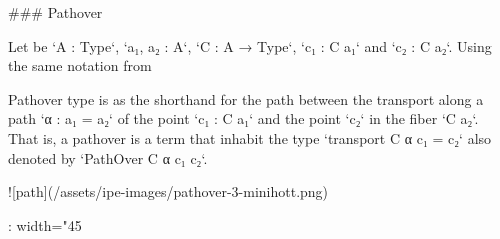 {### Pathover

Let be `A : Type`, `a₁, a₂ : A`, `C : A → Type`, `c₁ : C a₁` and `c₂ : C a₂`.
Using the same notation from {%
Pathover type is as the shorthand for the path between the transport along a
path `α : a₁ = a₂` of the point `c₁ : C a₁` and the point `c₂` in the fiber `C
a₂`. That is, a pathover is a term that inhabit the type `transport C α c₁ = c₂`
also denoted by `PathOver C α c₁ c₂`.

![path](/assets/ipe-images/pathover-3-minihott.png){: width="45%

\begin{code}%
\>[0]\<%
\\
\>[0][@{}l@{\AgdaIndent{0}}]%
\>[2]\AgdaSymbol{:}\AgdaSpace{}%
\AgdaSpace{}%
\AgdaSymbol{\{}\AgdaSpace{}%
\AgdaSymbol{\}}\AgdaSpace{}%
\AgdaSymbol{\{}\AgdaSpace{}%
\AgdaSymbol{:}\AgdaSpace{}%
\AgdaSpace{}%
\AgdaSymbol{\}}\<%
\\
%
\>[2]\AgdaSpace{}%
\AgdaSymbol{(}\AgdaSpace{}%
\AgdaSymbol{:}\AgdaSpace{}%
\AgdaSpace{}%
\AgdaSpace{}%
\AgdaSpace{}%
\AgdaSymbol{)}\AgdaSpace{}%
\AgdaSymbol{\{}\AgdaSpace{}%
\AgdaSpace{}%
\AgdaSymbol{:}\AgdaSpace{}%
\AgdaSymbol{\}}\<%
\\
%
\>[2]\AgdaSpace{}%
\AgdaSymbol{(}\AgdaSpace{}%
\AgdaSymbol{:}\AgdaSpace{}%
\AgdaSpace{}%
\AgdaOperator{\AgdaDatatype{==}}\AgdaSpace{}%
\AgdaSymbol{)}\<%
\\
%
\>[2]\AgdaSpace{}%
\AgdaSymbol{(}\AgdaSpace{}%
\AgdaSymbol{:}\AgdaSpace{}%
\AgdaSpace{}%
\AgdaSymbol{)}\AgdaSpace{}%
\AgdaSpace{}%
\AgdaSymbol{(}\AgdaSpace{}%
\AgdaSymbol{:}\AgdaSpace{}%
\AgdaSpace{}%
\AgdaSymbol{)}\<%
\\
%
\>[2]\AgdaComment{------------------------------}\<%
\\
%
\>[2]\AgdaSpace{}%
\AgdaSpace{}%
\<%
\\
%
\\[\AgdaEmptyExtraSkip]%
\>[0]\AgdaSpace{}%
\AgdaSpace{}%
\AgdaSpace{}%
\AgdaSpace{}%
\AgdaSpace{}%
\AgdaSymbol{=}\AgdaSpace{}%
\AgdaSpace{}%
\AgdaSpace{}%
\AgdaSpace{}%
\AgdaSpace{}%
\AgdaOperator{\AgdaDatatype{==}}\AgdaSpace{}%
\<%
\end{code}

}}}
